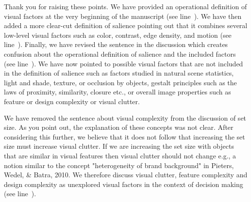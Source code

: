
Thank you for raising these points. We have provided an operational definition of visual factors at the very beginning of the manuscript (see line~). We have then added a more clear-cut definition of salience pointing out that it combines several low-level visual factors such as color, contrast, edge density, and motion (see line~). Finally, we have revised the sentence in the discussion which creates confusion about the operational definition of salience and the included factors (see line~). We have now pointed to possible visual factors that are not included in the definition of salience such as factors studied in natural scene statistics, light and shade, texture, or occlusion by objects, gestalt principles such as the laws of proximity, similarity, closure etc., or overall image properties such as feature or design complexity or visual clutter. 



We have removed the sentence about visual complexity from the discussion of set size. As you point out, the explanation of these concepts was not clear. After considering this further, we believe that it does not follow that increasing the set size must increase visual clutter. If we are increasing the set size with objects that are similar in visual features then visual clutter should not change e.g., a notion similar to the concept "heterogeneity of brand background" in Pieters, Wedel, \& Batra, 2010. We therefore discuss visual clutter, feature complexity and design complexity as unexplored visual factors in the context of decision making (see line~).  


